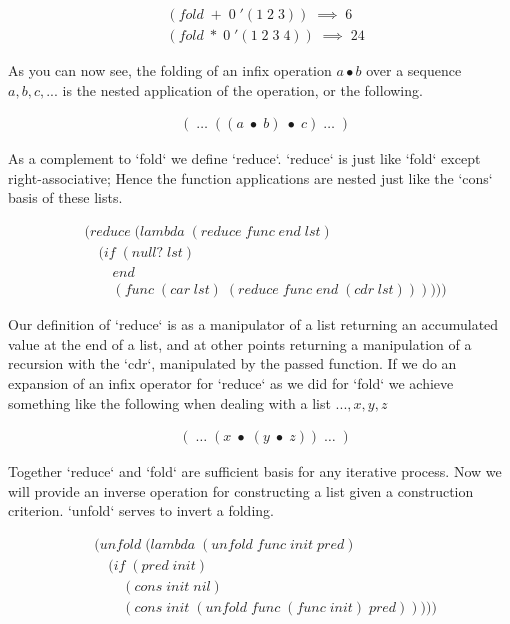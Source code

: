\documentclass[11pt]{article}
\begin{document}
\begin{align*}
& (fold \; + \; 0 \; '(1 \; 2 \; 3)) \; \implies \; 6
\\& (fold \; * \; 0 \; '(1 \; 2 \; 3 \; 4)) \; \implies \; 24
\end{align*}

As you can now see, the folding of an infix operation $a \bullet b$ over a sequence $a, b, c, ...$ is the nested application of the operation, or the following.

\begin{align*}
& ( \; \dots \; ((a \; \bullet \; b) \; \bullet \; c) \; \dots \; )
\end{align*}

As a complement to `fold` we define `reduce`. `reduce` is just like `fold` except right-associative; Hence the function applications are nested just like the `cons` basis of these lists.

\begin{align*}
& (reduce \; (lambda \; (reduce \; func \; end \; lst)
\\& \quad (if \; (null? \; lst)
\\& \qquad end
\\& \qquad (func \; (car \; lst) \; (reduce \; func \; end \; (cdr \; lst))))))
\end{align*}

Our definition of `reduce` is as a manipulator of a list returning an accumulated value at the end of a list, and at other points returning a manipulation of a recursion with the `cdr`, manipulated by the passed function. If we do an expansion of an infix operator for `reduce` as we did for `fold` we achieve something like the following when dealing with a list $... , x, y, z$

\begin{align*}
& ( \; \dots \; (x \; \bullet \; (y \; \bullet \; z)) \; \dots \; )
\end{align*}

Together `reduce` and `fold` are sufficient basis for any iterative process. Now we will provide an inverse operation for constructing a list given a construction criterion. `unfold` serves to invert a folding.

\begin{align*}
& (unfold \; (lambda \; (unfold \; func \; init \; pred)
\\& \quad (if \; (pred \; init)
\\& \qquad (cons \; init \; nil)
\\& \qquad (cons \; init \; (unfold \; func \; (func \; init) \; pred)))))
\end{align*}
\end{document}
